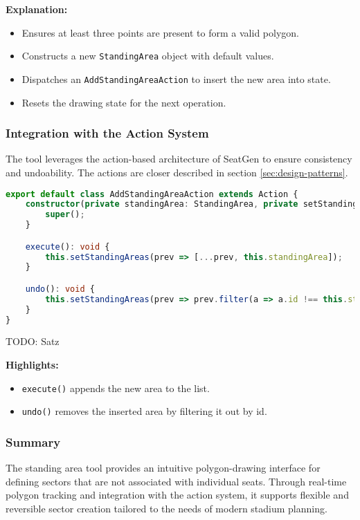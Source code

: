 \textbf{Explanation:}
\begin{itemize}
    \item Ensures at least three points are present to form a valid polygon.
    \item Constructs a new \texttt{StandingArea} object with default values.
    \item Dispatches an \texttt{AddStandingAreaAction} to insert the new area into state.
    \item Resets the drawing state for the next operation.
\end{itemize}

\subsubsection{Integration with the Action System}
The tool leverages the action-based architecture of SeatGen to ensure consistency and undoability. The actions are closer described in section \ref{sec:design-patterns}.

\begin{lstlisting}[language=TypeScript, caption=AddStandingAreaAction, label=lst:add-standingarea-action]
export default class AddStandingAreaAction extends Action {
    constructor(private standingArea: StandingArea, private setStandingAreas: React.Dispatch<React.SetStateAction<StandingArea[]>>) {
        super();
    }

    execute(): void {
        this.setStandingAreas(prev => [...prev, this.standingArea]);
    }

    undo(): void {
        this.setStandingAreas(prev => prev.filter(a => a.id !== this.standingArea.id));
    }
}
\end{lstlisting}

TODO: Satz

\textbf{Highlights:}
\begin{itemize}
    \item \texttt{execute()} appends the new area to the list.
    \item \texttt{undo()} removes the inserted area by filtering it out by id.
\end{itemize}

\subsubsection{Summary}
The standing area tool provides an intuitive polygon-drawing interface for defining sectors that are not associated with individual seats. Through real-time polygon tracking and integration with the action system, it supports flexible and reversible sector creation tailored to the needs of modern stadium planning.
